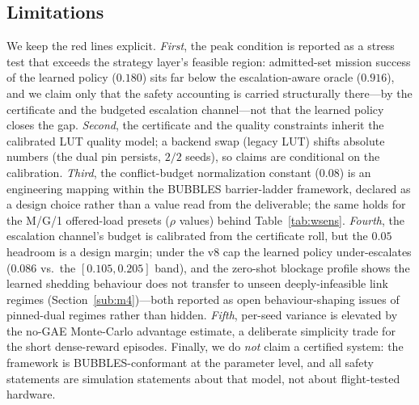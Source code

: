 \subsection{Limitations}\label{sub:limitations}
We keep the red lines explicit. \emph{First}, the peak condition is
reported as a stress test that exceeds the strategy layer's feasible
region: admitted-set mission success of the learned policy ($0.180$) sits
far below the escalation-aware oracle ($0.916$), and we claim only that
the safety accounting is carried structurally there---by the certificate
and the budgeted escalation channel---not that the learned policy closes
the gap. \emph{Second}, the certificate and the quality constraints
inherit the calibrated LUT quality model; a backend swap (legacy LUT)
shifts absolute numbers (the dual pin persists, $2/2$ seeds), so claims
are conditional on the calibration. \emph{Third}, the conflict-budget
normalization constant ($0.08$) is an engineering mapping within the
BUBBLES barrier-ladder framework, declared as a design choice rather than
a value read from the deliverable; the same holds for the M/G/1 offered-load
presets ($\rho$ values) behind Table~\ref{tab:wsens}. \emph{Fourth},
the escalation channel's budget is calibrated from the certificate roll,
but the $0.05$ headroom is a design margin; under the v8 cap the
learned policy under-escalates ($0.086$ vs.\ the $[0.105,0.205]$ band),
and the zero-shot blockage profile shows the learned shedding behaviour
does not transfer to unseen deeply-infeasible link regimes
(Section~\ref{sub:m4})---both reported as open behaviour-shaping issues
of pinned-dual regimes rather than hidden. \emph{Fifth}, per-seed variance is elevated by the
no-GAE Monte-Carlo advantage estimate, a deliberate simplicity trade for
the short dense-reward episodes. Finally, we do \emph{not} claim a
certified system: the framework is BUBBLES-conformant at the
parameter level, and all safety statements are simulation statements about
that model, not about flight-tested hardware.
